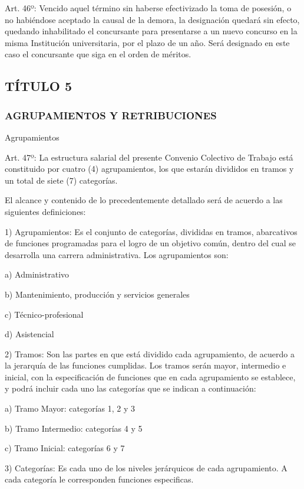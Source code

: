 \documentclass[]{article}
\begin{document}
Art. 46º: Vencido aquel término sin haberse efectivizado la toma de
posesión, o no habiéndose aceptado la causal de la demora, la
designación quedará sin efecto, quedando inhabilitado el concursante
para presentarse a un nuevo concurso en la misma Institución
universitaria, por el plazo de un año. Será designado en este caso el
concursante que siga en el orden de méritos.

\subsection{TÍTULO 5}\label{tuxedtulo-5}

\subsubsection{AGRUPAMIENTOS Y
RETRIBUCIONES}\label{agrupamientos-y-retribuciones}

Agrupamientos

Art. 47º: La estructura salarial del presente Convenio Colectivo de
Trabajo está constituido por cuatro (4) agrupamientos, los que estarán
divididos en tramos y un total de siete (7) categorías.

El alcance y contenido de lo precedentemente detallado será de acuerdo a
las siguientes definiciones:

1) Agrupamientos: Es el conjunto de categorías, divididas en tramos,
abarcativos de funciones programadas para el logro de un objetivo común,
dentro del cual se desarrolla una carrera administrativa. Los
agrupamientos son:

a) Administrativo

b) Mantenimiento, producción y servicios generales

c) Técnico-profesional

d) Asistencial

2) Tramos: Son las partes en que está dividido cada agrupamiento, de
acuerdo a la jerarquía de las funciones cumplidas. Los tramos serán
mayor, intermedio e inicial, con la especificación de funciones que en
cada agrupamiento se establece, y podrá incluir cada uno las categorías
que se indican a continuación:

a) Tramo Mayor: categorías 1, 2 y 3

b) Tramo Intermedio: categorías 4 y 5

c) Tramo Inicial: categorías 6 y 7

3) Categorías: Es cada uno de los niveles jerárquicos de cada
agrupamiento. A cada categoría le corresponden funciones especificas.
\end{document}
